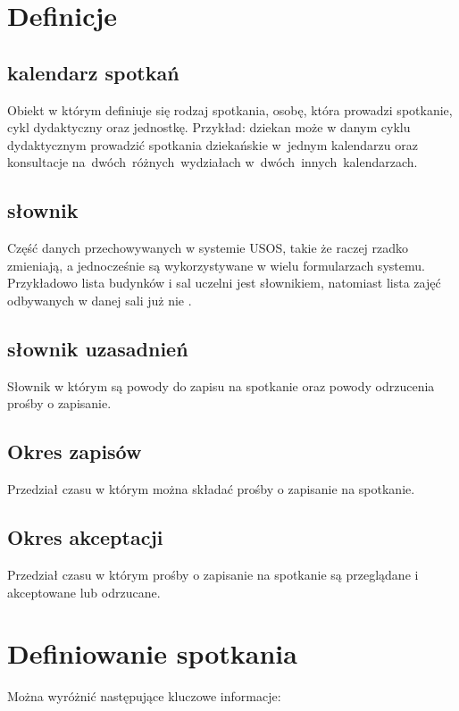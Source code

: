\documentclass[licencjacka]{pracamgr}
\begin{document}
\section{Definicje}
\subsection{kalendarz spotkań}
Obiekt w którym definiuje się rodzaj spotkania, osobę, która prowadzi spotkanie, cykl dydaktyczny oraz jednostkę. Przykład: dziekan może w danym cyklu dydaktycznym prowadzić spotkania dziekańskie w~jednym kalendarzu oraz konsultacje na~dwóch~różnych~wydziałach w~dwóch~innych~kalendarzach.

\subsection{słownik}
Część danych  przechowywanych  w  systemie  USOS, takie  że  raczej  rzadko  zmieniają,  a  jednocześnie  są wykorzystywane w wielu formularzach systemu. Przykładowo lista budynków i sal uczelni jest słownikiem, natomiast lista zajęć odbywanych w danej sali już nie \cite{prz}.

\subsection{słownik uzasadnień}
Słownik w którym są powody do zapisu na spotkanie oraz powody odrzucenia prośby o zapisanie.

\subsection{Okres zapisów}
Przedział czasu w którym można składać prośby o zapisanie na spotkanie.

\subsection{Okres akceptacji}
Przedział czasu w którym prośby o zapisanie na spotkanie są przeglądane i akceptowane lub odrzucane.


\section{Definiowanie spotkania}
Można wyróżnić następujące kluczowe informacje:
\end{document}
